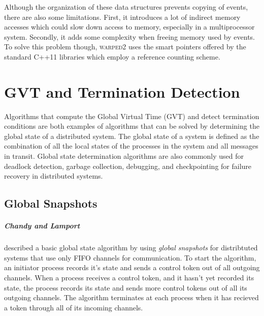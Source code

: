 \documentclass[11pt]{book}
\begin{document}
Although the organization of these data structures prevents copying of events, there are also
some limitations. First, it introduces a lot of indirect memory accesses which could slow down
access to memory, especially in a multiprocessor system. Secondly, it adds some complexity
when freeing memory used by events. To solve this problem though, \textsc{warped2} uses the
smart pointers offered by the standard C++11 libraries which employ a reference counting
scheme.



\chapter{GVT and Termination Detection}\label{gvt_termination}

Algorithms that compute the Global Virtual Time (GVT) and detect termination conditions are
both examples of algorithms that can be solved by determining the global state of a
distributed system. The global state of a system is defined as the combination of all
the local states of the processes in the system and all messages in transit. Global state
determination algorithms are also commonly used for deadlock detection, garbage collection,
debugging, and checkpointing for failure recovery in distributed systems.

\section{Global Snapshots}

\paragraph{Chandy and Lamport}\cite{chandy-85} described a basic global state algorithm by
using \emph{global snapshots} for distribtuted systems that use only FIFO channels for
communication. To start the algorithm, an initiator process records it's state and sends
a control token out of all outgoing channels. When a process receives a control token, and
it hasn't yet recorded its state, the process records its state and sends more control
tokens out of all its outgoing channels. The algorithm terminates at each process when it
has recieved a token through all of its incoming channels.
\end{document}
